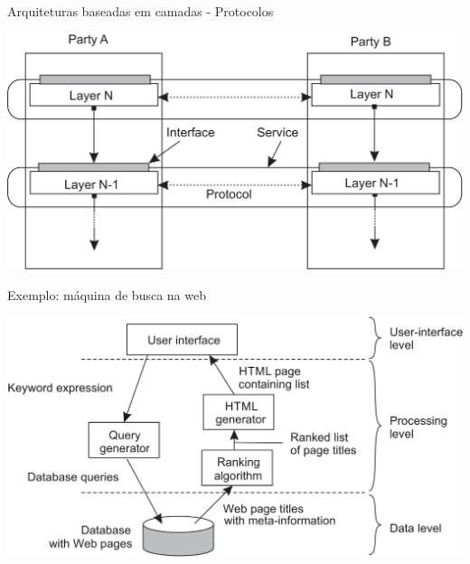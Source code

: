 \documentclass[compress]{beamer}
\begin{document}
\begin{frame}{Arquiteturas baseadas em camadas - Protocolos}

\centering \includegraphics[width=\textwidth]{images/camadas_protocolo.png}
\end{frame}


\begin{frame}{Exemplo: máquina de busca na web}

\centering \includegraphics[width=\textwidth]{images/camadas_maquina_busca.png}
\end{frame}

\end{document}
